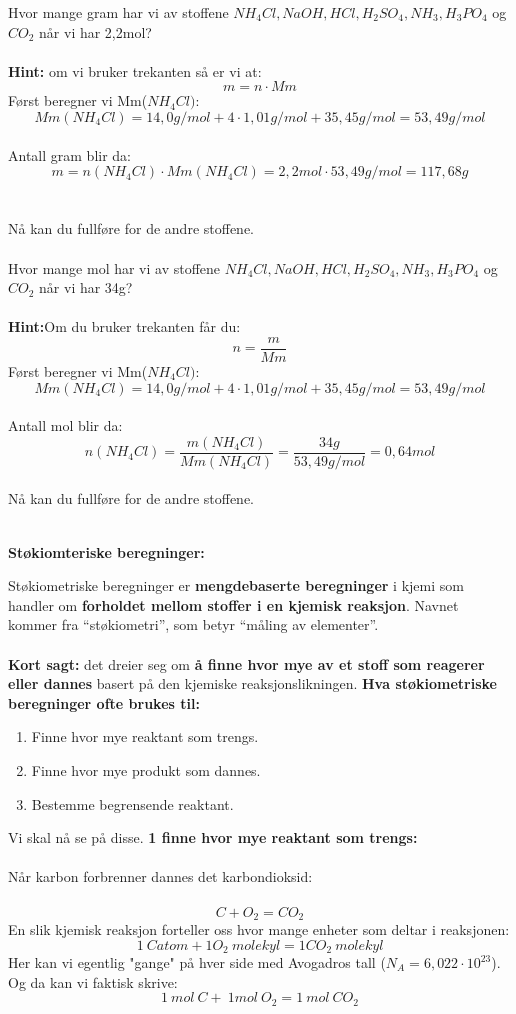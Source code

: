 \documentclass[12pt,a4paper]{article}
\begin{document}
\noindent Hvor mange gram har vi av stoffene $NH_4Cl, NaOH, HCl, H_2SO_4, NH_3, H_3PO_4$ og$ CO_2$ når vi har 2,2mol?\\\\
\textbf{Hint:} om vi bruker trekanten så er vi at:
$$m=n\cdot Mm$$
Først beregner vi Mm($NH_4Cl)$:
$$Mm(NH_4Cl)=14,0g/mol+4\cdot 1,01g/mol+35,45g/mol=53,49g/mol$$\\
Antall gram blir da:\\
$$m=n(NH_4Cl)\cdot Mm(NH_4Cl)=2,2mol\cdot 53,49g/mol=117,68g$$\\\\
Nå kan du fullføre for de andre stoffene.\\\\
Hvor mange mol har vi av stoffene $NH_4Cl, NaOH, HCl, H_2SO_4, NH_3, H_3PO_4$ og $CO_2$ når vi har 34g?\\\\
\textbf{Hint:}Om du bruker trekanten får du:
$$n=\frac{m}{Mm}$$
Først beregner vi Mm($NH_4Cl)$:
$$Mm(NH_4Cl)=14,0g/mol+4\cdot 1,01g/mol+35,45g/mol=53,49g/mol$$\\
Antall mol blir da:
$$n(NH_4Cl)=\frac{m(NH_4Cl)}{Mm(NH_4Cl)}=\frac{34g}{53,49g/mol}=0,64mol$$\\
Nå kan du fullføre for de andre stoffene.\\\\
\begin{center}
    \textbf{Støkiomteriske beregninger:}
\end{center}\vspace{1cm}
Støkiometriske beregninger er \textbf{mengdebaserte beregninger} i kjemi som handler om \textbf{forholdet mellom stoffer i en kjemisk reaksjon}. Navnet kommer fra “støkiometri”, som betyr “måling av elementer”.\\\\
\textbf{Kort sagt:} det dreier seg om \textbf{å finne hvor mye av et stoff som reagerer eller dannes} basert på den kjemiske reaksjonslikningen.
\textbf{Hva støkiometriske beregninger ofte brukes til:}
\begin{enumerate}
    \item Finne hvor mye reaktant som trengs.
    \item Finne hvor mye produkt som dannes.
    \item Bestemme begrensende reaktant.   
\end{enumerate}
Vi skal nå se på disse.\newpage
\noindent\textbf{1 finne hvor mye reaktant som trengs:}\\\\
Når karbon forbrenner dannes det karbondioksid:\\\\
$$C+O_2=CO_2$$
En slik kjemisk reaksjon forteller oss hvor mange enheter som deltar i reaksjonen:\\
$$1\:C atom+1O_2\:molekyl=1CO_2\:molekyl$$
Her kan vi egentlig "gange" på hver side med Avogadros tall ($N_A=6,022\cdot 10^{23}$). Og da kan vi faktisk skrive:
$$1\:mol\:C+\:1mol\:O_2=1\:mol\:CO_2$$
\end{document}
